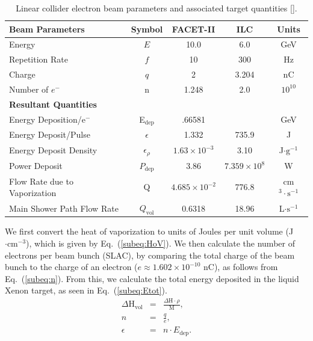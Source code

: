 \documentclass[%
reprint,
amsmath, amssymb,
aps,
floatfix,
]{revtex4-2}
\begin{document}
\begin{table}
    \centering
    \begin{tabular}{lcccc}
        \hline \hline
        \textbf{Beam Parameters} & \textbf{Symbol} & \textbf{FACET-II} & \textbf{ILC} & \textbf{Units} \\
        \hline
        Energy & $E$ & 10.0 & 6.0 & GeV \\
        Repetition Rate & $f$ & 10 & 300 & Hz \\
        Charge & $q$ & 2 & 3.204 & nC \\
        Number of $e^-$ & n & 1.248 & 2.0 & $10^{10}$ \\
        \hline \hline
        \textbf{Resultant Quantities} \\
        \hline
        Energy Deposition/e$^-$ & E$_{\textrm{dep}}$ & .66581 & & GeV \\
        Energy Deposit/Pulse & $\epsilon$ & 1.332 & 735.9 & J \\
        Energy Deposit Density & $\epsilon_\rho$ & $1.63\times 10^{-3}$ & 3.10 & J$\cdot\textrm{g}^{-1}$ \\
        Power Deposit & $P_\textrm{dep}$ & $3.86$ & $7.359\times 10^8$ & W \\
        Flow Rate due to Vaporization & Q & $4.685 \times 10^{-2}$ & 776.8 & cm$^3\cdot \textrm{s}^{-1}$ \\
        Main Shower Path Flow Rate & $Q_\textrm{vol}$ & 0.6318 & 18.96 & L$\cdot \textrm{s}^{-1}$ \\
        \hline \hline
    \end{tabular}
    \caption{\label{tab:BeamInfo}Linear collider electron beam parameters and associated target quantities [].}
\end{table}

We first convert the heat of vaporization to units of Joules per unit volume (J$\cdot \textrm{cm}^{-3}$),
which is given by Eq.~(\ref{subeq:HoV}).
We then calculate the number of electrons per beam bunch (SLAC), by comparing the 
total charge of the beam bunch to the charge of an electron
($e \approx 1.602 \times 10^{-10}$ nC), as follows from Eq.~(\ref{subeq:n}).
From this, we calculate the total energy deposited in the liquid Xenon target, 
as seen in Eq.~(\ref{subeq:Etot}).
\begin{subequations}
    \begin{eqnarray}
        \Delta \textrm{H}_\textrm{vol} &=& \frac{\Delta \textrm{H}\cdot \rho}{\textrm{M}}, \label{subeq:HoV} \\
        n &=& \frac{q}{e}, \label{subeq:n} \\
        \epsilon &=& n \cdot E_{\textrm{dep}} \label{subeq:Etot}.
    \end{eqnarray}
\end{subequations}
    
\end{document}
